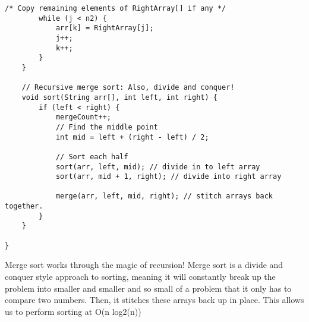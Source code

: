 \documentclass[letterpaper, 10pt,DIV=13]{scrartcl}
\numberwithin{equation}{section} %
\numberwithin{figure}{section} %
\numberwithin{table}{section} %
\begin{document}
\begin{lstlisting}[frame=single, ]
        /* Copy remaining elements of RightArray[] if any */
        while (j < n2) {
            arr[k] = RightArray[j];
            j++;
            k++;
        }
    }

    // Recursive merge sort: Also, divide and conquer!
    void sort(String arr[], int left, int right) {
        if (left < right) {
            mergeCount++;
            // Find the middle point
            int mid = left + (right - left) / 2;

            // Sort each half
            sort(arr, left, mid); // divide in to left array
            sort(arr, mid + 1, right); // divide into right array

            merge(arr, left, mid, right); // stitch arrays back together.
        }
    }

}
\end{lstlisting}
Merge sort works through the magic of recursion! Merge sort is a divide and conquer style approach to sorting, meaning it will constantly break up the problem into smaller and smaller and so small of a problem that it only has to compare two numbers. Then, it stitches these arrays back up in place. This allows us to perform sorting at O(n log2(n))
\end{document}
